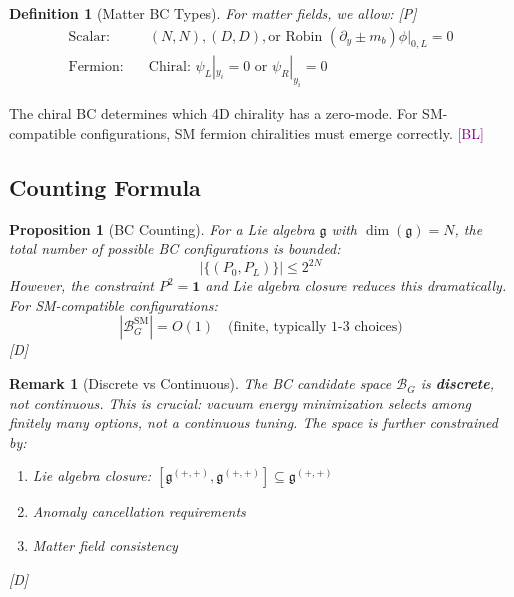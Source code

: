 \documentclass[11pt,a4paper]{article}
\newtheorem{proposition}[theorem]{Proposition}
\newtheorem{definition}[theorem]{Definition}
\newtheorem{remark}[theorem]{Remark}
\newcommand{\tagD}{\textcolor{blue!70!black}{[D]}}
\newcommand{\tagP}{\textcolor{green!50!black}{[P]}}
\newcommand{\tagBL}{\textcolor{purple}{[BL]}}
\begin{document}
\begin{definition}[Matter BC Types]
\label{def:matter-bc}
For matter fields, we allow: \tagP
\begin{align}
\label{eq:scalar-bc}
\text{Scalar:} \quad & (N,N), (D,D), \text{or Robin } (\partial_y \pm m_b)\phi|_{0,L} = 0 \\
\label{eq:fermion-bc}
\text{Fermion:} \quad & \text{Chiral: } \psi_L|_{y_i} = 0 \text{ or } \psi_R|_{y_i} = 0
\end{align}
\end{definition}

The chiral BC determines which 4D chirality has a zero-mode. For SM-compatible
configurations, SM fermion chiralities must emerge correctly. \tagBL

\subsection{Counting Formula}

\begin{proposition}[BC Counting]
\label{prop:bc-count}
For a Lie algebra $\mathfrak{g}$ with $\dim(\mathfrak{g}) = N$, the total number of
possible BC configurations is bounded:
\begin{equation}
\label{eq:bc-count}
|\{(P_0, P_L)\}| \leq 2^{2N}
\end{equation}
However, the constraint $P^2 = \mathbf{1}$ and Lie algebra closure reduces this dramatically.
For SM-compatible configurations:
\begin{equation}
\label{eq:bc-sm-count}
|\mathcal{B}_G^{\text{SM}}| = O(1) \quad \text{(finite, typically 1-3 choices)}
\end{equation}
\tagD
\end{proposition}

\begin{remark}[Discrete vs Continuous]
The BC candidate space $\mathcal{B}_G$ is \textbf{discrete}, not continuous.
This is crucial: vacuum energy minimization selects among finitely many options,
not a continuous tuning. The space is further constrained by:
\begin{enumerate}
    \item Lie algebra closure: $[\mathfrak{g}^{(+,+)}, \mathfrak{g}^{(+,+)}] \subseteq \mathfrak{g}^{(+,+)}$
    \item Anomaly cancellation requirements
    \item Matter field consistency
\end{enumerate}
\tagD
\end{remark}
\end{document}
